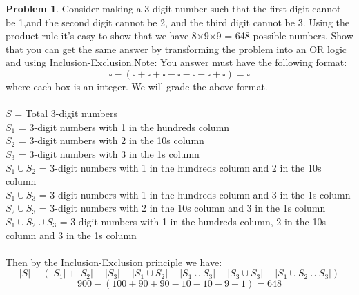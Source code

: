 \documentclass[10pt,leqno ]{article}
\theoremstyle{definition}
\newtheorem{problem}[theorem]{Problem}
\begin{document}
\begin{problem} Consider making a 3-digit number such that the first digit cannot be 1,and the second digit cannot be 2, and the third digit cannot be 3.  Using the product rule it’s easy to show that we have 8×9×9 = 648 possible numbers.   Show  that  you  can  get  the  same  answer  by  transforming  the problem into an OR logic and using Inclusion-Exclusion.Note:  You answer must have the following format:
$$\square - (\square + \square + \square - \square - \square - \square + \square) = \square$$
where each box is an integer.  We will grade the above format.
\\\\
\Large
$S$ = Total 3-digit numbers\\
$S_1$ = 3-digit numbers with 1 in the hundreds column\\
$S_2$ = 3-digit numbers with 2 in the 10s column\\
$S_3$ = 3-digit numbers with 3 in the 1s column\\
$S_1 \cup S_2$ = 3-digit numbers with 1 in the hundreds column and 2 in the 10s column\\
$S_1 \cup S_3$ = 3-digit numbers with 1 in the hundreds column and 3 in the 1s column\\
$S_2 \cup S_3$ = 3-digit numbers with 2 in the 10s column and 3 in the 1s column\\
$S_1 \cup S_2 \cup S_3$ = 3-digit numbers with 1 in the hundreds column, 2 in the 10s column and 3 in the 1s column\\
\\
Then by the Inclusion-Exclusion principle we have:
$$|S| - (|S_1| + |S_2| + |S_3| - |S_1 \cup S_2| - |S_1 \cup S_3|- |S_3 \cup S_3| + |S_1 \cup S_2 \cup S_3|)$$
$$900 - (100 + 90 + 90 - 10 - 10 - 9 + 1) = 648$$
\end{problem}
\newpage
\end{document}
